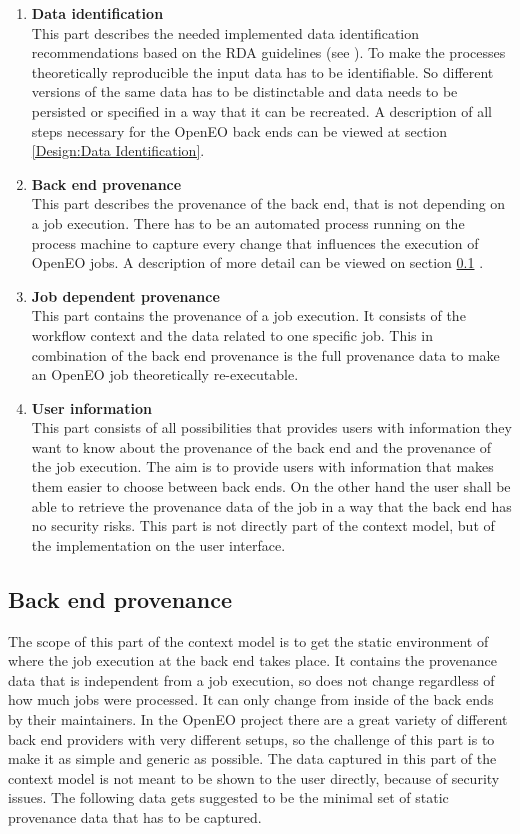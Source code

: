 \documentclass[draft,final]{vutinfth} %
\begin{document}
\begin{enumerate}
	\item \textbf{Data identification} \\
	This part describes the needed implemented data identification recommendations based on the RDA guidelines (see \cite{rauber2016identification}). To make the processes theoretically reproducible the input data has to be identifiable. So different versions of the same data has to be distinctable and data needs to be persisted or specified in a way that it can be recreated. A description of all steps necessary for the OpenEO back ends can be viewed at section \ref{Design:Data Identification}.
	\item \textbf{Back end provenance} \\
	This part describes the provenance of the back end, that is not depending on a job execution. There has to be an automated process running on the process machine to capture every change that influences the execution of OpenEO jobs. A description of more detail can be viewed on section \ref{Design:Back end provenance} .     
	\item\textbf{Job dependent provenance} \\
	This part contains the provenance of a job execution. It consists of the workflow context and the data related to one specific job. This in combination of the back end provenance is the full provenance data to make an OpenEO job theoretically re-executable.   
	\item \textbf{User information} \\
	This part consists of all possibilities that provides users with information they want to know about the provenance of the back end and the provenance of the job execution. The aim is to provide users with information that makes them easier to choose between back ends. On the other hand the user shall be able to retrieve the provenance data of the job in a way that the back end has no security risks. This part is not directly part of the context model, but of the implementation on the user interface. 
\end{enumerate}

\subsection{Back end provenance}\label{Design:Back end provenance}
The scope of this part of the context model is to get the static environment of where the job execution at the back end takes place. It contains the provenance data that is independent from a job execution, so does not change regardless of how much jobs were processed. It can only change from inside of the back ends by their maintainers. In the OpenEO project there are a great variety of different back end providers with very different setups, so the challenge of this part is to make it as simple and generic as possible. The data captured in this part of the context model is not meant to be shown to the user directly, because of security issues. The following data gets suggested to be the minimal set of static provenance data that has to be captured. 
\end{document}
